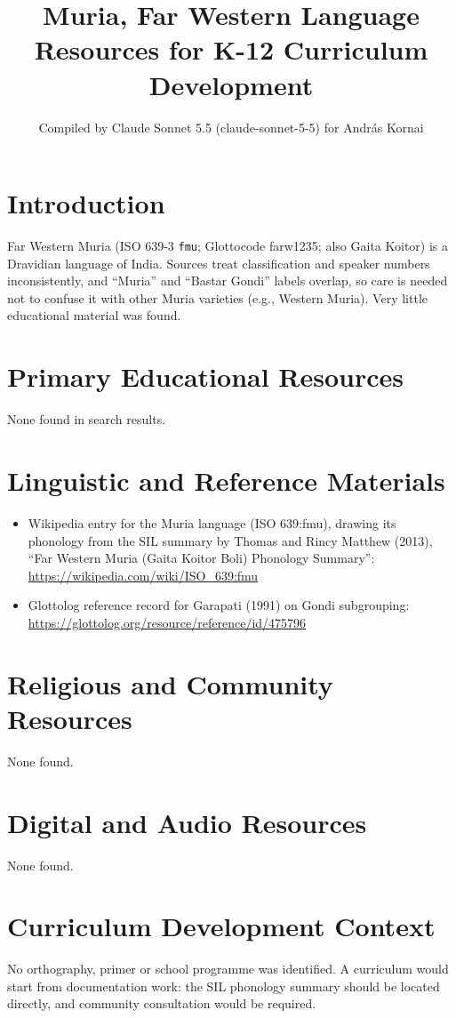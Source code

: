 \documentclass[12pt]{article}
\title{Muria, Far Western Language Resources for K-12 Curriculum Development}
\author{Compiled by Claude Sonnet 5.5 (claude-sonnet-5-5) for Andr\'as Kornai}
\date{}
\begin{document}
\maketitle

\section{Introduction}
Far Western Muria (ISO 639-3 \texttt{fmu}; Glottocode farw1235; also Gaita Koitor) is a Dravidian language of India. Sources treat classification and speaker numbers inconsistently, and ``Muria'' and ``Bastar Gondi'' labels overlap, so care is needed not to confuse it with other Muria varieties (e.g., Western Muria). Very little educational material was found.

\section{Primary Educational Resources}
None found in search results.

\section{Linguistic and Reference Materials}
\begin{itemize}
\item Wikipedia entry for the Muria language (ISO 639:fmu), drawing its phonology from the SIL summary by Thomas and Rincy Matthew (2013), ``Far Western Muria (Gaita Koitor Boli) Phonology Summary'': \url{https://wikipedia.com/wiki/ISO_639:fmu}
\item Glottolog reference record for Garapati (1991) on Gondi subgrouping: \url{https://glottolog.org/resource/reference/id/475796}
\end{itemize}

\section{Religious and Community Resources}
None found.

\section{Digital and Audio Resources}
None found.

\section{Curriculum Development Context}
No orthography, primer or school programme was identified. A curriculum would start from documentation work: the SIL phonology summary should be located directly, and community consultation would be required.
\end{document}

